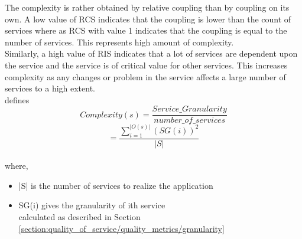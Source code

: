 {{{{{The complexity is rather obtained by relative coupling than by coupling on its own. A low value of RCS indicates that the coupling is lower than the count of services where as RCS with value 1 indicates that the coupling is equal to the number of services. This represents high amount of complexity.
\\
Similarly, a high value of RIS indicates that a lot of services are dependent upon the service and the service is of critical value for other services. This increases complexity as any changes or problem in the service affects a large number of services to a high extent.
\\
\cite{Saad-Alahmari:2011aa} defines
$$ Complexity(s) = \frac{Service\_Granularity}{number\_of\_services} $$ $$ =\frac{\sum_{i=1}^{|O(s)|}(SG(i))^2}{|S|}$$
\\
where,
\\
\begin{itemize}[leftmargin=.5in]
\item |S| is the number of services to realize the application
\item SG(i) gives the granularity of ith service 
\\calculated as described in Section \ref{section:quality_of_service/quality_metrics/granularity}
\end{itemize}


}}}}}
